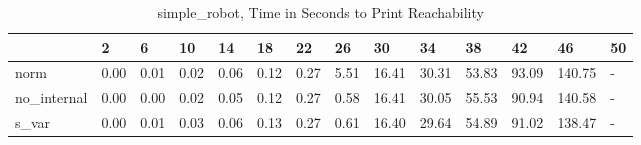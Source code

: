 \begin{table}
\caption{simple_robot, Time in Seconds to Print Reachability}
\label{simple_robot_states_time}
\begin{tabular}{llllllllllllll}
\toprule
 & 2 & 6 & 10 & 14 & 18 & 22 & 26 & 30 & 34 & 38 & 42 & 46 & 50 \\
\midrule
norm & 0.00 & 0.01 & 0.02 & 0.06 & 0.12 & 0.27 & 5.51 & 16.41 & 30.31 & 53.83 & 93.09 & 140.75 & - \\
no_internal & 0.00 & 0.00 & 0.02 & 0.05 & 0.12 & 0.27 & 0.58 & 16.41 & 30.05 & 55.53 & 90.94 & 140.58 & - \\
s_var & 0.00 & 0.01 & 0.03 & 0.06 & 0.13 & 0.27 & 0.61 & 16.40 & 29.64 & 54.89 & 91.02 & 138.47 & - \\
\bottomrule
\end{tabular}
\end{table}
